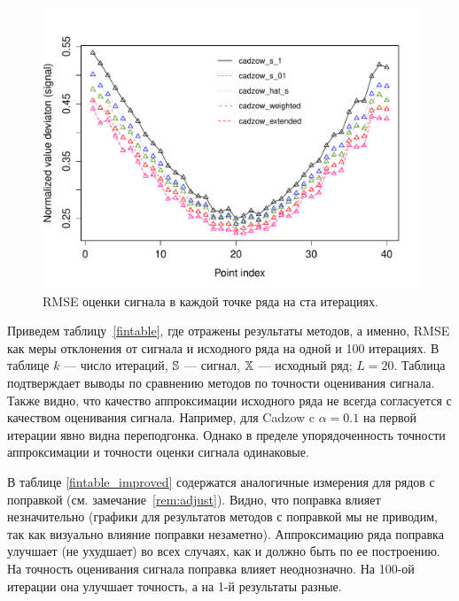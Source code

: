 \documentclass[12pt,a4paper,fleqn,leqno]{article}
\begin{document}
\begin{figure}[!hhh]
\begin{center}
\includegraphics[width = 13cm]{s1_it100.pdf}
\caption{RMSE оценки сигнала в каждой точке ряда на ста итерациях.}
\label{fig:s1_it100}
\end{center}
\end{figure}

Приведем таблицу~\ref{fintable}, где отражены результаты методов, а именно, RMSE как меры отклонения от сигнала и исходного ряда на одной и 100 итерациях.
В таблице $k$ --- число итераций, $\mathbb{S}$ --- сигнал, $\mathbb{X}$ --- исходный ряд; $L=20$. Таблица подтверждает выводы по сравнению методов по точности
оценивания сигнала. Также видно, что качество аппроксимации исходного ряда не всегда согласуется с качеством оценивания сигнала.
Например, для Cadzow c $\alpha=0.1$ на первой итерации явно видна переподгонка. Однако в пределе упорядоченность точности аппроксимации
и точности оценки сигнала одинаковые.

В таблице \ref{fintable_improved} содержатся аналогичные измерения для рядов с поправкой (см. замечание~\ref{rem:adjust}).
Видно, что поправка влияет незначительно (графики для результатов методов с поправкой мы не приводим, так как визуально влияние поправки незаметно). Аппроксимацию ряда поправка улучшает (не ухудшает) во всех случаях,
как и должно быть по ее построению. На точность оценивания сигнала поправка влияет неоднозначно. На 100-ой итерации она улучшает точность,
а на 1-й результаты разные.
\end{document}

